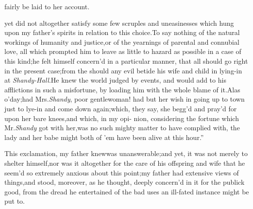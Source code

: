 \documentclass{article}
\begin{document}
fairly be laid to her account.

yet did not
altogether satisfy some few scruples and uneasinesses which hung
upon my father’s spirits in relation to this choice.\tsk To
say nothing of the natural workings of humanity and
justice,\tsk or of the yearnings of parental and connubial love,
all which prompted him to leave as little to hazard as possible in a case of this
kind;\tsh he felt himself concern’d in a particular
manner, that all should go right in the present case;\tsk from
the
should any evil betide his
wife and child in lying-in at \textit{Shandy-Hall}.\tsh He
knew the world judged by events, and would add to his afflictions
in such a misfortune, by loading him with the whole blame of
it.\tsh \lqq Alas o’day;\tsk had Mrs.\@ \textit{Shandy},\break
\lqq poor gentlewoman! had but her wish\break
\lqq in going up to town just to lye-in and\break
\lqq come down again;\tsk which, they say,\break
\lqq she begg’d and pray’d for upon her\break
\lqq bare knees,\tsh and which, in my opi-\break
\lqq nion, considering the fortune which\break
\lqq Mr.\@ \textit{Shandy} got with her,\tsk was no such\break
\lqq mighty matter to have complied with,\break
\lqq the lady and her babe might both of\break
\lqq ’em have been alive at this hour.”

This exclamation, my father knew\break was unanswerable;\tsk and
yet, it was not merely to shelter himself,\tsk nor was it
altogether for the care of his offspring and wife that he seem’d so
extremely anxious about this point;\tsk my father had extensive
views of things,\tsh and stood, moreover, as he thought,
deeply concern’d in it for the publick good,\break 
from the dread he entertained of the\break
bad uses an ill-fated instance might be\break
put to.
\end{document}
